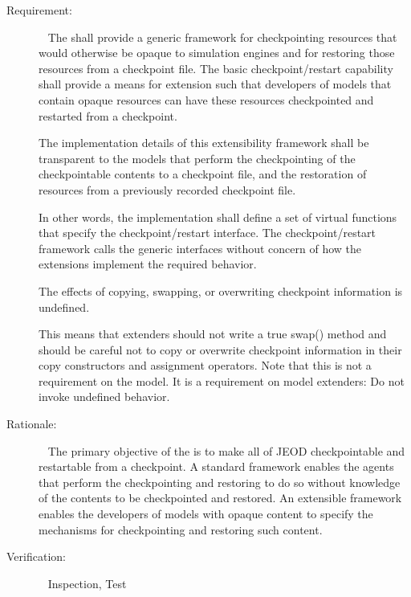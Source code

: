 \label{reqt:chkpt}
\begin{description}
\item[Requirement:]\ \newline
  The \ModelDesc shall provide a generic framework for checkpointing resources
  that would otherwise be opaque to simulation engines and for restoring those
  resources from a checkpoint file.
  \label{reqt::checkpt_extensibility}
  The basic checkpoint/restart capability shall provide a means for extension
  such that developers of models that contain opaque resources can have these
  resources checkpointed and restarted from a checkpoint.

  \label{reqt::checkpt_transparency}
  The implementation details of this extensibility framework shall be
  transparent to the models that perform the checkpointing of the
  checkpointable contents to a checkpoint file, and the restoration of
  resources from a previously recorded checkpoint file.

  In other words, the implementation shall define a set of virtual functions
  that specify the checkpoint/restart interface. The checkpoint/restart
  framework calls the generic interfaces without concern of how the
  extensions implement the required behavior.

  \label{reqt::checkpt_bad_scoobies}
  The effects of copying, swapping, or overwriting checkpoint information
  is undefined.

  This means that extenders should not write a true swap() method and should
  be careful not to copy or overwrite checkpoint information in their
  copy constructors and assignment operators. Note that this is not a
  requirement on the model. It is a requirement on model extenders:
  Do not invoke undefined behavior.

\item[Rationale:]\ \newline
  The primary objective of the \ModelDesc is to make all of JEOD checkpointable
  and restartable from a checkpoint. A standard framework enables the agents
  that perform the checkpointing and restoring to do so without knowledge of
  the contents to be checkpointed and restored. An extensible framework enables
  the developers of models with opaque content to specify the mechanisms for
  checkpointing and restoring such content.
  
\item[Verification:]\ \newline
  Inspection, Test
\end{description}


